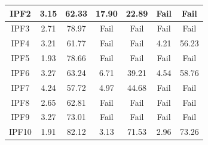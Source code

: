 {\begin{landscape}
\begin{table}[htbp]
\begin{tabular}{| c | c | c | c | c | c | c |}
IPF2 & 3.15 & 62.33 & 17.90 & 22.89 & Fail & Fail\\
\hline
IPF3 & 2.71 & 78.97 & Fail & Fail & Fail & Fail\\
\hline
IPF4 & 3.21 & 61.77 & Fail & Fail & 4.21 & 56.23\\
\hline
IPF5 & 1.93 & 78.66 & Fail & Fail & Fail & Fail\\	
\hline
IPF6 & 3.27 & 63.24 & 6.71 & 39.21 & 4.54 & 58.76\\	
\hline
IPF7 & 4.24 & 57.72 & 4.97 & 44.68 & Fail & Fail\\	
\hline
IPF8 & 2.65 & 62.81 & Fail & Fail & Fail & Fail\\	
\hline
IPF9 & 3.27 & 73.01 & Fail & Fail & Fail & Fail\\
\hline
IPF10 & 1.91 & 82.12 & 3.13 & 71.53 & 2.96 & 73.26\\								
\hline
\end{tabular}
\end{table}
\end{landscape}
\restoregeometry

}
